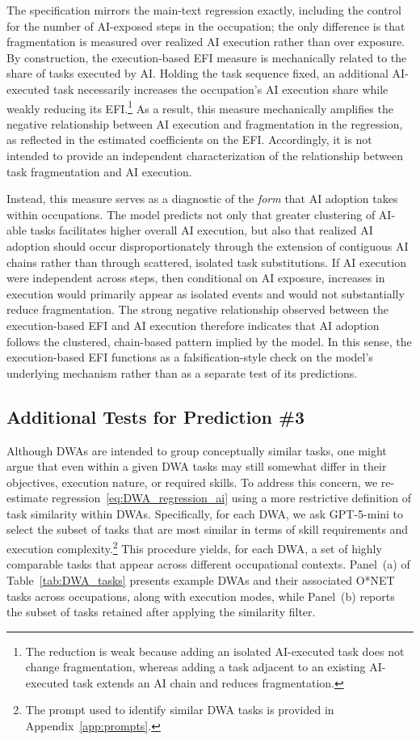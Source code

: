 The specification mirrors the main-text regression exactly, including the control for the number of AI-exposed steps in the occupation; the only difference is that fragmentation is measured over realized AI execution rather than over exposure.
By construction, the execution-based EFI measure is mechanically related to the share of tasks executed by AI.
Holding the task sequence fixed, an additional AI-executed task necessarily increases the occupation's AI execution share while weakly reducing its EFI.\footnote{The reduction is weak because adding an isolated AI-executed task does not change fragmentation, whereas adding a task adjacent to an existing AI-executed task extends an AI chain and reduces fragmentation.}
As a result, this measure mechanically amplifies the negative relationship between AI execution and fragmentation in the regression, as reflected in the estimated coefficients on the EFI.
Accordingly, it is not intended to provide an independent characterization of the relationship between task fragmentation and AI execution.

Instead, this measure serves as a diagnostic of the \emph{form} that AI adoption takes within occupations.
The model predicts not only that greater clustering of AI-able tasks facilitates higher overall AI execution, but also that realized AI adoption should occur disproportionately through the extension of contiguous AI chains rather than through scattered, isolated task substitutions.
If AI execution were independent across steps, then conditional on AI exposure, increases in execution would primarily appear as isolated events and would not substantially reduce fragmentation.
The strong negative relationship observed between the execution-based EFI and AI execution therefore indicates that AI adoption follows the clustered, chain-based pattern implied by the model.
In this sense, the execution-based EFI functions as a falsification-style check on the model's underlying mechanism rather than as a separate test of its predictions.


\subsection{Additional Tests for Prediction \#3}
\label{app:additional_robustness_pred3}

Although DWAs are intended to group conceptually similar tasks, one might argue that even within a given DWA tasks may still somewhat differ in their objectives, execution nature, or required skills.
To address this concern, we re-estimate regression~\eqref{eq:DWA_regression_ai} using a more restrictive definition of task similarity within DWAs.
Specifically, for each DWA, we ask GPT-5-mini to select the subset of tasks that are most similar in terms of skill requirements and execution complexity.\footnote{The prompt used to identify similar DWA tasks is provided in Appendix~\ref{app:prompts}.}
This procedure yields, for each DWA, a set of highly comparable tasks that appear across different occupational contexts.
Panel~(a) of Table~\ref{tab:DWA_tasks} presents example DWAs and their associated O*NET tasks across occupations, along with execution modes, while Panel~(b) reports the subset of tasks retained after applying the similarity filter.

